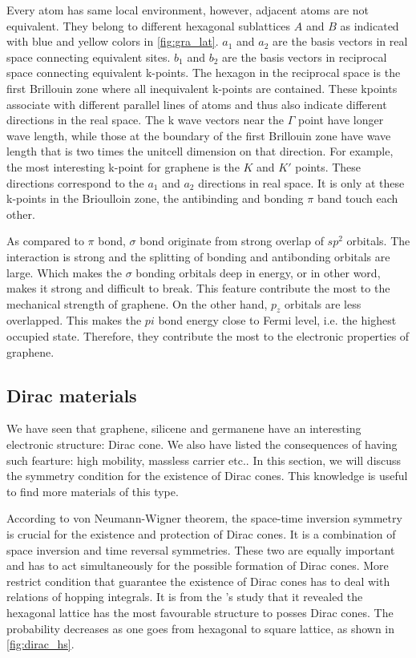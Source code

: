 Every atom has same local environment, however, adjacent atoms are not equivalent. They belong to different hexagonal sublattices $A$ and $B$ as indicated with blue and yellow colors in \autoref{fig:gra_lat}. $a_1$ and $a_2$ are the basis vectors in real space connecting equivalent sites. $b_1$ and $b_2$ are the basis vectors in reciprocal space connecting equivalent k-points. The hexagon in the reciprocal space is the first Brillouin zone where all inequivalent k-points are contained. These kpoints associate with different parallel lines of atoms and thus also indicate different directions in the real space. The k wave vectors near the $\Gamma$ point have longer wave length, while those at the boundary of the first Brillouin zone have wave length that is two times the unitcell dimension on that direction. For example, the most interesting k-point for graphene is the $K$ and $K'$ points. These directions correspond to the $a_1$ and $a_2$ directions in real space. It is only at these k-points in the Brioulloin zone, the antibinding and bonding $\pi$ band touch each other. 



As compared to $\pi$ bond, $\sigma$ bond originate from strong overlap of $sp^2$ orbitals. The interaction is strong and the splitting of bonding and antibonding orbitals are large. Which makes the $\sigma$ bonding orbitals deep in energy, or in other word, makes it strong and difficult to break. This feature contribute the most to the mechanical strength of graphene. On the other hand, $p_z$ orbitals are less overlapped. This makes the $pi$ bond energy close to Fermi level, i.e. the highest occupied state. Therefore, they contribute the most to the electronic properties of graphene.  



\subsection{Dirac materials}

We have seen that graphene, silicene and germanene have an interesting electronic structure: Dirac cone. We also have listed the consequences of having such fearture: high mobility, massless carrier etc.. In this section, we will discuss the symmetry condition for the existence of Dirac cones. This knowledge is useful to find more materials of this type. 

According to von Neumann-Wigner theorem, the space-time inversion symmetry is crucial for the existence and protection of Dirac cones\cite{Wang2015b}. It is a combination of space inversion and time reversal symmetries. These two are equally important and has to act simultaneously for the possible formation of Dirac cones. More restrict condition that guarantee the existence of Dirac cones has to deal with relations of hopping integrals\cite{Hasegawa2006,Liu2013}. It is from the \citet{Liu2013}'s study that it revealed the hexagonal lattice has the most favourable structure to posses Dirac cones. The probability decreases as one goes from hexagonal to square lattice, as shown in \autoref{fig:dirac_hs}.

